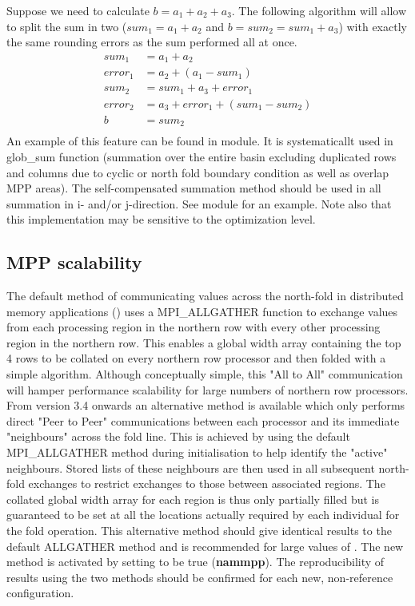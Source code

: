 \documentclass[../main/NEMO_manual]{subfiles}
\begin{document}
Suppose we need to calculate $b = a_1 + a_2 + a_3$.
The following algorithm will allow to split the sum in two
($sum_1 = a_{1} + a_{2}$ and $b = sum_2 = sum_1 + a_3$) with exactly the same rounding errors as
the sum performed all at once.
\begin{align*}
	sum_1 \ \  &= a_1 + a_2 \\
	error_1     &= a_2 + ( a_1 - sum_1 ) \\
	sum_2 \ \  &= sum_1 + a_3 + error_1 \\
	error_2     &= a_3 + error_1 + ( sum_1 - sum_2 ) \\
	b \qquad \ &= sum_2 \\
\end{align*}
An example of this feature can be found in  module.
It is systematicallt used in glob\_sum function (summation over the entire basin excluding duplicated rows and
columns due to cyclic or north fold boundary condition as well as overlap MPP areas).
The self-compensated summation method should be used in all summation in i- and/or j-direction.
See  module for an example.
Note also that this implementation may be sensitive to the optimization level. 

\subsection{MPP scalability}
\label{subsec:MISC_mppsca}

The default method of communicating values across the north-fold in distributed memory applications ()
uses a \textsc{MPI\_ALLGATHER} function to exchange values from each processing region in
the northern row with every other processing region in the northern row.
This enables a global width array containing the top 4 rows to be collated on every northern row processor and then
folded with a simple algorithm.
Although conceptually simple, this "All to All" communication will hamper performance scalability for
large numbers of northern row processors.
From version 3.4 onwards an alternative method is available which only performs direct "Peer to Peer" communications
between each processor and its immediate "neighbours" across the fold line.
This is achieved by using the default \textsc{MPI\_ALLGATHER} method during initialisation to
help identify the "active" neighbours.
Stored lists of these neighbours are then used in all subsequent north-fold exchanges to
restrict exchanges to those between associated regions.
The collated global width array for each region is thus only partially filled but is guaranteed to
be set at all the locations actually required by each individual for the fold operation.
This alternative method should give identical results to the default \textsc{ALLGATHER} method and
is recommended for large values of .
The new method is activated by setting  to be true ({\bf nammpp}).
The reproducibility of results using the two methods should be confirmed for each new,
non-reference configuration.
\end{document}
